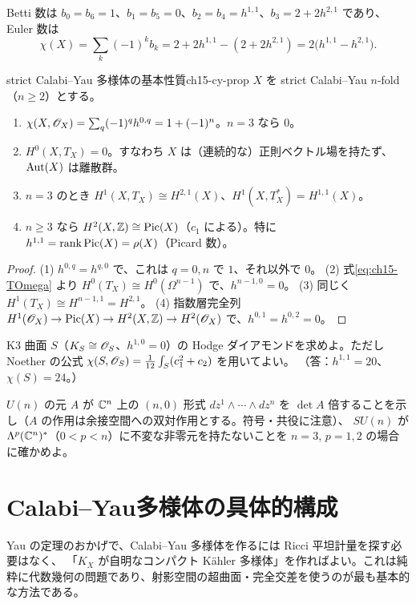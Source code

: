 Betti 数は $b_0=b_6=1$、$b_1=b_5=0$、$b_2=b_4=h^{1,1}$、$b_3 = 2+2h^{2,1}$ であり、Euler 数は
\[
\chi(X) = \sum_k(-1)^kb_k = 2 + 2h^{1,1} - (2+2h^{2,1}) = 2\big(h^{1,1}-h^{2,1}\big).
\]

\begin{myprop}{strict Calabi--Yau 多様体の基本性質}{ch15-cy-prop}
$X$ を strict Calabi--Yau $n$-fold（$n\ge 2$）とする。
\begin{enumerate}
\item $\chi(X,\mathscr{O}_X) = \sum_q(-1)^qh^{0,q} = 1+(-1)^n$。$n=3$ なら $0$。
\item $H^0(X,T_X) = 0$。すなわち $X$ は（連続的な）正則ベクトル場を持たず、$\operatorname{Aut}(X)$ は離散群。
\item $n=3$ のとき $H^1(X,T_X)\cong H^{2,1}(X)$、$H^1(X,T^*_X) = H^{1,1}(X)$。
\item $n\ge3$ なら $H^2(X,\mathbb{Z})\cong\operatorname{Pic}(X)$（$c_1$ による）。特に $h^{1,1} = \operatorname{rank}\operatorname{Pic}(X) = \rho(X)$（Picard 数）。
\end{enumerate}
\end{myprop}

\begin{proof}
(1) $h^{0,q} = h^{q,0}$ で、これは $q=0,n$ で $1$、それ以外で $0$。
(2) 式\eqref{eq:ch15-TOmega} より $H^0(T_X)\cong H^0(\Omega^{n-1}) $ で、$h^{n-1,0} = 0$。
(3) 同じく $H^1(T_X)\cong H^{n-1,1} = H^{2,1}$。
(4) 指数層完全列 $H^1(\mathscr{O}_X)\to\operatorname{Pic}(X)\to H^2(X,\mathbb{Z})\to H^2(\mathscr{O}_X)$ で、$h^{0,1}=h^{0,2}=0$。
\end{proof}

K3 曲面 $S$（$K_S\cong\mathscr{O}_S$、$h^{1,0}=0$）の Hodge ダイアモンドを求めよ。ただし Noether の公式 $\chi(S,\mathscr{O}_S) = \frac{1}{12}\int_S(c_1^2+c_2)$ を用いてよい。
（答：$h^{1,1}=20$、$\chi(S)=24$。）

$U(n)$ の元 $A$ が $\mathbb{C}^n$ 上の $(n,0)$ 形式 $dz^1\wedge\cdots\wedge dz^n$ を $\det A$ 倍することを示し（$A$ の作用は余接空間への双対作用とする。符号・共役に注意）、
$SU(n)$ が $\Lambda^p(\mathbb{C}^n)^*$（$0<p<n$）に不変な非零元を持たないことを $n=3$, $p=1,2$ の場合に確かめよ。

\section{Calabi--Yau多様体の具体的構成}

Yau の定理のおかげで、Calabi--Yau 多様体を作るには Ricci 平坦計量を探す必要はなく、
「$K_X$ が自明なコンパクト K\"ahler 多様体」を作ればよい。これは純粋に代数幾何の問題であり、射影空間の超曲面・完全交差を使うのが最も基本的な方法である。

